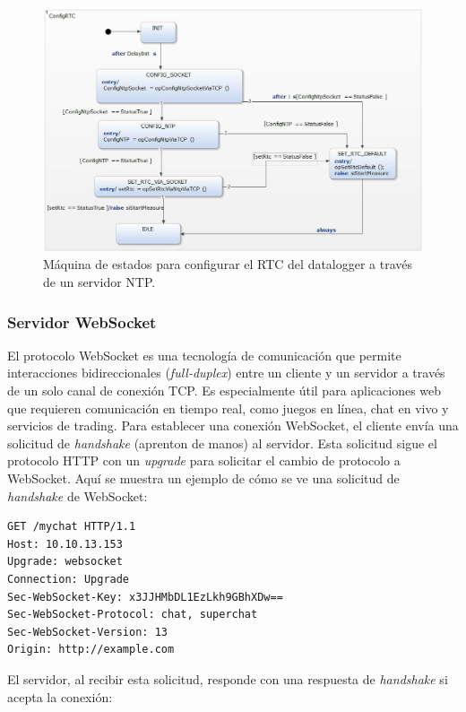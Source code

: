 \begin{figure}[H]
    \centering
    \includegraphics[width=0.9\linewidth]{Figuras/datalogger/Firmware/ntpServer.jpg}
    \caption{Máquina de estados para configurar el RTC del datalogger a través de un servidor NTP.}
    \label{fig:ntpServer}
\end{figure}

\subsubsection{Servidor WebSocket}\label{sec:serverWebSocket}
 
El protocolo WebSocket es una tecnología de comunicación que permite interacciones bidireccionales (\textit{full-duplex}) entre un cliente y un servidor a través de un solo canal de conexión TCP. Es especialmente útil para aplicaciones web que requieren comunicación en tiempo real, como juegos en línea, chat en vivo y servicios de trading. Para establecer una conexión WebSocket, el cliente envía una solicitud de  \textit{handshake} (aprenton de manos) al servidor. Esta solicitud sigue el protocolo HTTP con un \textit{upgrade} para solicitar el cambio de protocolo a WebSocket. Aquí se muestra un ejemplo de cómo se ve una solicitud de \textit{handshake} de WebSocket:

\begin{verbatim}
GET /mychat HTTP/1.1
Host: 10.10.13.153
Upgrade: websocket
Connection: Upgrade
Sec-WebSocket-Key: x3JJHMbDL1EzLkh9GBhXDw==
Sec-WebSocket-Protocol: chat, superchat
Sec-WebSocket-Version: 13
Origin: http://example.com
\end{verbatim}

El servidor, al recibir esta solicitud, responde con una respuesta de \textit{handshake} si acepta la conexión:

